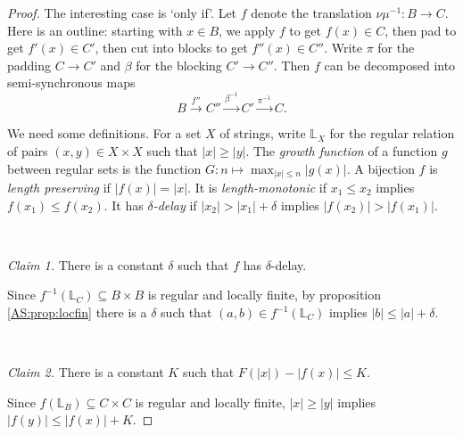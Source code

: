\begin{proof}
The interesting case is `only if'. %
 Let $f$ denote the translation $\nu\mu^{-1}:B \to C$. 
% 
% 
Here is an outline: starting with $x \in B$, we apply $f$ to get $f(x) \in C$, then pad to get $f'(x) \in C'$,
then cut into blocks to get $f''(x) \in C''$. 
Write $\pi$ for the padding $C \to C'$ and $\beta$ for the blocking $C' \to C''$.
Then $f$ can be decomposed into semi-synchronous maps
\[
 B \stackrel{f''}{\to} C'' \stackrel{\beta^{-1}}{\to} C' \stackrel{\pi^{-1}}{\to} C.
\]

We need some definitions. 
For a set $X$ of strings, write $\mathbb{L}_X$ for the regular relation of pairs $(x,y) \in X \times X$ such that $|x| \geq |y|$. 
The {\em growth function} of a function $g$ between regular sets is the function 
$G:n \mapsto \max_{|x| \leq n} |g(x)|$. A bijection $f$ is {\em length preserving} if $|f(x)| = |x|$.
It is {\em length-monotonic} if $x_1 \leq x_2$ implies $f(x_1) \leq f(x_2)$. It has {\em $\delta$-delay} 
if $|x_2| > |x_1| + \delta$ implies $|f(x_2)| > |f(x_1)|$.


\

\noindent
{\em Claim 1.} There is a constant $\delta$ such that $f$ has $\delta$-delay.

Since $f^{-1}(\mathbb{L}_C) \subseteq B \times B$ is regular and locally finite, by proposition \ref{AS:prop:locfin} there is a $\delta$
such that $(a,b) \in f^{-1}(\mathbb{L}_C)$ implies $|b| \leq |a| + \delta$.%

\

\noindent
{\em Claim 2.} There is a constant $K$ such that $F(|x|) - |f(x)| \leq K$.

Since $f(\mathbb{L}_B) \subseteq C \times C$ is regular and locally finite, $|x| \geq |y|$ implies $|f(y)| \leq |f(x)| + K$.


\end{proof}
